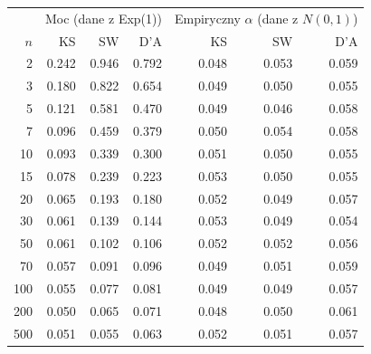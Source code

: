 \begin{tabular}{r|rrr|rrr}
\toprule
 & \multicolumn{3}{c|}{Moc (dane z Exp(1))} & \multicolumn{3}{c}{Empiryczny $\alpha$ (dane z $N(0,1)$)} \\
$n$ & KS & SW & D'A & KS & SW & D'A \\
\midrule
2 & 0.242 & 0.946 & 0.792 & 0.048 & 0.053 & 0.059 \\
3 & 0.180 & 0.822 & 0.654 & 0.049 & 0.050 & 0.055 \\
5 & 0.121 & 0.581 & 0.470 & 0.049 & 0.046 & 0.058 \\
7 & 0.096 & 0.459 & 0.379 & 0.050 & 0.054 & 0.058 \\
10 & 0.093 & 0.339 & 0.300 & 0.051 & 0.050 & 0.055 \\
15 & 0.078 & 0.239 & 0.223 & 0.053 & 0.050 & 0.055 \\
20 & 0.065 & 0.193 & 0.180 & 0.052 & 0.049 & 0.057 \\
30 & 0.061 & 0.139 & 0.144 & 0.053 & 0.049 & 0.054 \\
50 & 0.061 & 0.102 & 0.106 & 0.052 & 0.052 & 0.056 \\
70 & 0.057 & 0.091 & 0.096 & 0.049 & 0.051 & 0.059 \\
100 & 0.055 & 0.077 & 0.081 & 0.049 & 0.049 & 0.057 \\
200 & 0.050 & 0.065 & 0.071 & 0.048 & 0.050 & 0.061 \\
500 & 0.051 & 0.055 & 0.063 & 0.052 & 0.051 & 0.057 \\
\bottomrule
\end{tabular}
